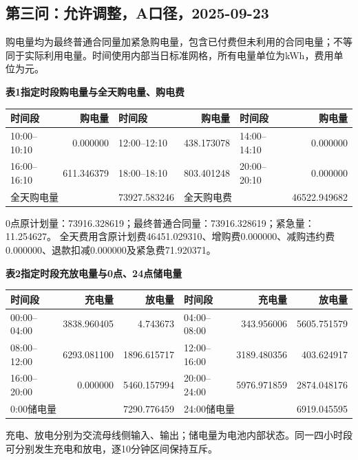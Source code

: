 \subsection{第三问：允许调整，A口径，2025-09-23}
\begingroup\small
\setlength{\tabcolsep}{4pt}\renewcommand{\arraystretch}{1.08}
\setlength{\LTpre}{4pt}\setlength{\LTpost}{4pt}
\noindent 购电量均为最终普通合同量加紧急购电量，包含已付费但未利用的合同电量；不等同于实际利用电量。时间使用内部当日标准网格，所有电量单位为kWh，费用单位为元。
\begin{center}\textbf{表1\quad 指定时段购电量与全天购电量、购电费}\par\smallskip
\begin{tabular}{lr lr lr}\toprule
时间段 & 购电量 & 时间段 & 购电量 & 时间段 & 购电量\\\midrule
10:00--10:10 & 0.000000 & 12:00--12:10 & 438.173078 & 14:00--14:10 & 0.000000\\
16:00--16:10 & 611.346379 & 18:00--18:10 & 803.401248 & 20:00--20:10 & 0.000000\\
\midrule
\multicolumn{2}{l}{全天购电量} & 73927.583246 & \multicolumn{2}{l}{全天购电费} & 46522.949682\\
\bottomrule\end{tabular}\end{center}
\noindent 0点原计划量：73916.328619；最终普通合同量：73916.328619；紧急量：11.254627。
全天费用含原计划费46451.029310、增购费0.000000、减购违约费0.000000、退款扣减0.000000及紧急费71.920371。
\begin{center}\textbf{表2\quad 指定时段充放电量与0点、24点储电量}\par\smallskip
\begin{tabular}{lrr lrr}\toprule
时间段 & 充电量 & 放电量 & 时间段 & 充电量 & 放电量\\\midrule
00:00--04:00 & 3838.960405 & 4.743673 & 04:00--08:00 & 343.956006 & 5605.751579\\
08:00--12:00 & 6293.081100 & 1896.615717 & 12:00--16:00 & 3189.480356 & 403.624917\\
16:00--20:00 & 0.000000 & 5460.157994 & 20:00--24:00 & 5976.971859 & 2874.048176\\
\midrule
\multicolumn{2}{l}{0:00储电量} & 7290.776459 & \multicolumn{2}{l}{24:00储电量} & 6919.045595\\
\bottomrule\end{tabular}\end{center}
\noindent 充电、放电分别为交流母线侧输入、输出；储电量为电池内部状态。同一四小时段可分别发生充电和放电，逐10分钟区间保持互斥。
